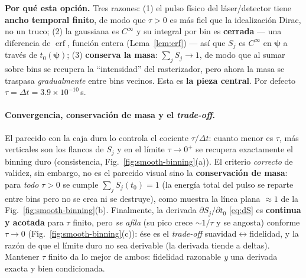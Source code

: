 \documentclass[11pt,a4paper]{article}
\theoremstyle{plain}
\theoremstyle{definition}
\newcommand{\vect}[1]{\boldsymbol{#1}}
\newcommand{\erf}{\operatorname{erf}}
\begin{document}
\textbf{Por qu\'e esta opci\'on.} Tres razones: (1) el pulso f\'isico del
l\'aser/detector tiene \textbf{ancho temporal finito}, de modo que $\tau>0$ es
m\'as fiel que la idealizaci\'on Dirac, no un truco; (2) la gaussiana es
$C^\infty$ y su integral por bin es \textbf{cerrada} --- una diferencia de $\erf$,
funci\'on entera (Lema~\ref{lem:erf}) --- as\'i que $S_j$ es $C^\infty$ en
$\vect{\psi}$ a trav\'es de $t_0(\vect{\psi})$; (3) \textbf{conserva la masa}:
$\sum_j S_j\to1$, de modo que al sumar sobre bins se recupera la ``intensidad''
del rasterizador, pero ahora la masa se traspasa \emph{gradualmente} entre bins
vecinos. Esta es \textbf{la pieza central}. Por defecto
$\tau=\Delta t=3.9\times10^{-10}$\,s.

\paragraph{Convergencia, conservaci\'on de masa y el \emph{trade-off}.} El
parecido con la caja dura lo controla el cociente $\tau/\Delta t$: cuanto menor
es $\tau$, m\'as verticales son los flancos de $S_j$ y en el l\'imite
$\tau\to0^+$ se recupera exactamente el binning duro (consistencia,
Fig.~\ref{fig:smooth-binning}(a)). El criterio \emph{correcto} de validez, sin
embargo, no es el parecido visual sino la \textbf{conservaci\'on de masa}: para
\emph{todo} $\tau>0$ se cumple $\sum_j S_j(t_0)=1$ (la energ\'ia total del pulso se
reparte entre bins pero no se crea ni se destruye), como muestra la l\'inea plana
$\approx1$ de la Fig.~\ref{fig:smooth-binning}(b). Finalmente, la derivada
$\partial S_j/\partial t_0$ \eqref{eq:dS} es \textbf{continua y acotada} para
$\tau$ finito, pero \emph{se afila} (su pico crece $\sim1/\tau$ y se angosta)
conforme $\tau\to0$ (Fig.~\ref{fig:smooth-binning}(c)): \'ese es el \emph{trade-off}
suavidad$\leftrightarrow$fidelidad, y la raz\'on de que el l\'imite duro no sea
derivable (la derivada tiende a deltas). Mantener $\tau$ finito da lo mejor de
ambos: fidelidad razonable \emph{y} una derivada exacta y bien condicionada.
\end{document}
